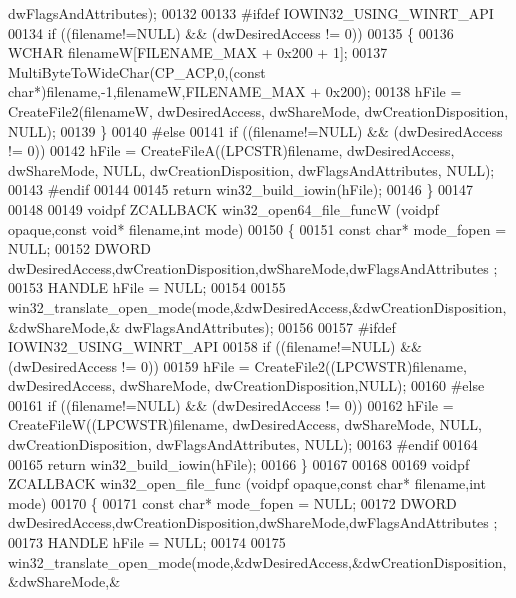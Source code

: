 \begin{DoxyCode}
      dwFlagsAndAttributes);
00132 
00133 \textcolor{preprocessor}{#ifdef IOWIN32\_USING\_WINRT\_API}
00134     \textcolor{keywordflow}{if} ((filename!=NULL) && (dwDesiredAccess != 0))
00135     \{
00136         WCHAR filenameW[FILENAME\_MAX + 0x200 + 1];
00137         MultiByteToWideChar(CP\_ACP,0,(\textcolor{keyword}{const} \textcolor{keywordtype}{char}*)filename,-1,filenameW,FILENAME\_MAX + 0x200);
00138         hFile = CreateFile2(filenameW, dwDesiredAccess, dwShareMode, dwCreationDisposition, NULL);
00139     \}
00140 \textcolor{preprocessor}{#else}
00141     \textcolor{keywordflow}{if} ((filename!=NULL) && (dwDesiredAccess != 0))
00142         hFile = CreateFileA((LPCSTR)filename, dwDesiredAccess, dwShareMode, NULL, dwCreationDisposition, 
      dwFlagsAndAttributes, NULL);
00143 \textcolor{preprocessor}{#endif}
00144 
00145     \textcolor{keywordflow}{return} win32\_build\_iowin(hFile);
00146 \}
00147 
00148 
00149 voidpf ZCALLBACK win32\_open64\_file\_funcW (voidpf opaque,\textcolor{keyword}{const} \textcolor{keywordtype}{void}* filename,\textcolor{keywordtype}{int} mode)
00150 \{
00151     \textcolor{keyword}{const} \textcolor{keywordtype}{char}* mode\_fopen = NULL;
00152     DWORD dwDesiredAccess,dwCreationDisposition,dwShareMode,dwFlagsAndAttributes ;
00153     HANDLE hFile = NULL;
00154 
00155     win32\_translate\_open\_mode(mode,&dwDesiredAccess,&dwCreationDisposition,&dwShareMode,&
      dwFlagsAndAttributes);
00156 
00157 \textcolor{preprocessor}{#ifdef IOWIN32\_USING\_WINRT\_API}
00158     \textcolor{keywordflow}{if} ((filename!=NULL) && (dwDesiredAccess != 0))
00159         hFile = CreateFile2((LPCWSTR)filename, dwDesiredAccess, dwShareMode, dwCreationDisposition,NULL);
00160 \textcolor{preprocessor}{#else}
00161     \textcolor{keywordflow}{if} ((filename!=NULL) && (dwDesiredAccess != 0))
00162         hFile = CreateFileW((LPCWSTR)filename, dwDesiredAccess, dwShareMode, NULL, dwCreationDisposition, 
      dwFlagsAndAttributes, NULL);
00163 \textcolor{preprocessor}{#endif}
00164 
00165     \textcolor{keywordflow}{return} win32\_build\_iowin(hFile);
00166 \}
00167 
00168 
00169 voidpf ZCALLBACK win32\_open\_file\_func (voidpf opaque,\textcolor{keyword}{const} \textcolor{keywordtype}{char}* filename,\textcolor{keywordtype}{int} mode)
00170 \{
00171     \textcolor{keyword}{const} \textcolor{keywordtype}{char}* mode\_fopen = NULL;
00172     DWORD dwDesiredAccess,dwCreationDisposition,dwShareMode,dwFlagsAndAttributes ;
00173     HANDLE hFile = NULL;
00174 
00175     win32\_translate\_open\_mode(mode,&dwDesiredAccess,&dwCreationDisposition,&dwShareMode,&

\end{DoxyCode}
